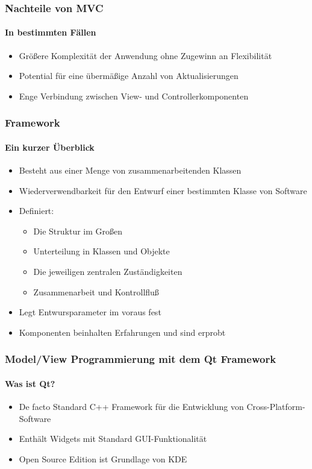 \begin{frame}
	\frametitle{Nachteile von MVC}
	\framesubtitle{In bestimmten Fällen}
	\begin{itemize}
		\item Größere Komplexität der Anwendung ohne Zugewinn an Flexibilität
		\item Potential für eine übermäßige Anzahl von Aktualisierungen
		\item Enge Verbindung zwischen View- und Controllerkomponenten
	\end{itemize}
\end{frame}

\begin{frame}
	\frametitle{Framework}
	\framesubtitle{Ein kurzer Überblick}
	\begin{itemize}
		\item Besteht aus einer Menge von zusammenarbeitenden Klassen
		\item Wiederverwendbarkeit für den Entwurf einer bestimmten Klasse
		von Software
		\item Definiert:
		\begin{itemize}
			\item Die Struktur im Großen
			\item Unterteilung in Klassen und Objekte
			\item Die jeweiligen zentralen Zuständigkeiten
			\item Zusammenarbeit und Kontrollfluß
		\end{itemize}
		\item Legt Entwursparameter im voraus fest
		\item Komponenten beinhalten Erfahrungen und sind erprobt
	\end{itemize}
\end{frame}

\begin{frame}
	\frametitle{Model/View Programmierung mit dem Qt Framework}
	\framesubtitle{Was ist Qt?}
	\begin{itemize}
		\item De facto Standard C++ Framework für die Entwicklung
		von Cross-Platform-Software
		\item Enthält Widgets mit Standard GUI-Funktionalität
		\item Open Source Edition ist Grundlage von KDE
	\end{itemize}
\end{frame}

